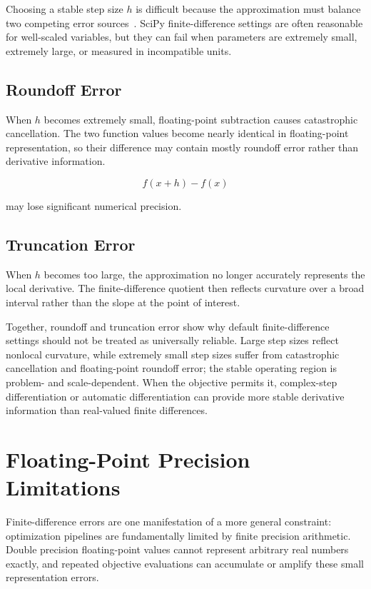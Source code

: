 Choosing a stable step size $h$ is difficult because the approximation must balance two competing error sources~\citep{press}. SciPy finite-difference settings are often reasonable for well-scaled variables, but they can fail when parameters are extremely small, extremely large, or measured in incompatible units.

\subsection{Roundoff Error}

When $h$ becomes extremely small, floating-point subtraction causes catastrophic cancellation. The two function values become nearly identical in floating-point representation, so their difference may contain mostly roundoff error rather than derivative information.

\begin{equation}
f(x+h) - f(x)
\end{equation}

may lose significant numerical precision.

\subsection{Truncation Error}

When $h$ becomes too large, the approximation no longer accurately represents the local derivative. The finite-difference quotient then reflects curvature over a broad interval rather than the slope at the point of interest.

Together, roundoff and truncation error show why default finite-difference settings should not be treated as universally reliable. Large step sizes reflect nonlocal curvature, while extremely small step sizes suffer from catastrophic cancellation and floating-point roundoff error; the stable operating region is problem- and scale-dependent. When the objective permits it, complex-step differentiation or automatic differentiation can provide more stable derivative information than real-valued finite differences.

\section{Floating-Point Precision Limitations}

Finite-difference errors are one manifestation of a more general constraint: optimization pipelines are fundamentally limited by finite precision arithmetic. Double precision floating-point values cannot represent arbitrary real numbers exactly, and repeated objective evaluations can accumulate or amplify these small representation errors.

